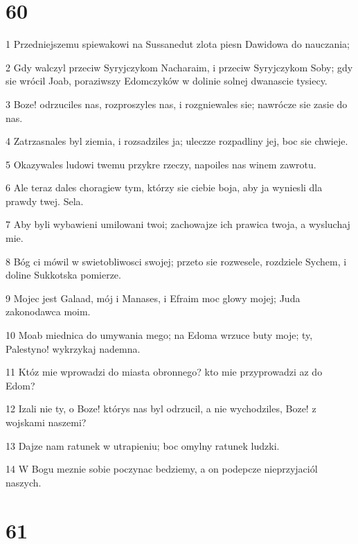 \chapter{60}

\par 1 Przedniejszemu spiewakowi na Sussanedut zlota piesn Dawidowa do nauczania;
\par 2 Gdy walczyl przeciw Syryjczykom Nacharaim, i przeciw Syryjczykom Soby; gdy sie wrócil Joab, poraziwszy Edomczyków w dolinie solnej dwanascie tysiecy.
\par 3 Boze! odrzuciles nas, rozproszyles nas, i rozgniewales sie; nawrócze sie zasie do nas.
\par 4 Zatrzasnales byl ziemia, i rozsadziles ja; uleczze rozpadliny jej, boc sie chwieje.
\par 5 Okazywales ludowi twemu przykre rzeczy, napoiles nas winem zawrotu.
\par 6 Ale teraz dales choragiew tym, którzy sie ciebie boja, aby ja wyniesli dla prawdy twej. Sela.
\par 7 Aby byli wybawieni umilowani twoi; zachowajze ich prawica twoja, a wysluchaj mie.
\par 8 Bóg ci mówil w swietobliwosci swojej; przeto sie rozwesele, rozdziele Sychem, i doline Sukkotska pomierze.
\par 9 Mojec jest Galaad, mój i Manases, i Efraim moc glowy mojej; Juda zakonodawca moim.
\par 10 Moab miednica do umywania mego; na Edoma wrzuce buty moje; ty, Palestyno! wykrzykaj nademna.
\par 11 Któz mie wprowadzi do miasta obronnego? kto mie przyprowadzi az do Edom?
\par 12 Izali nie ty, o Boze! którys nas byl odrzucil, a nie wychodziles, Boze! z wojskami naszemi?
\par 13 Dajze nam ratunek w utrapieniu; boc omylny ratunek ludzki.
\par 14 W Bogu meznie sobie poczynac bedziemy, a on podepcze nieprzyjaciól naszych.

\chapter{61}

